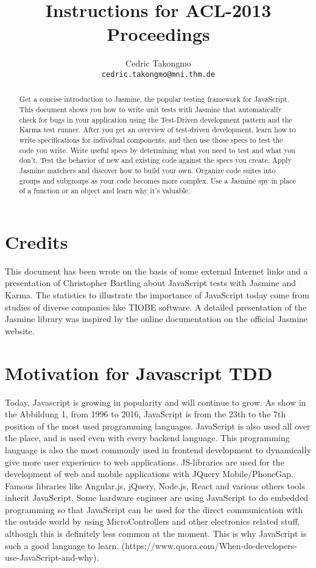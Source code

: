 \documentclass[11pt]{article}
\title{Instructions for ACL-2013 Proceedings}
\author{Cedric Takongmo \\
  {\tt cedric.takongmo@mni.thm.de}}
\date{}
\begin{document}
\maketitle
\begin{abstract}
Get a concise introduction to Jasmine, the popular testing framework for JavaScript. This document shows you how to write unit tests with Jasmine that automatically check for bugs in your application using the Test-Driven development pattern and the Karma test runner. After you get an overview of test-driven development, learn how to write specifications for individual components, and then use those specs to test the code you write. Write useful specs by determining what you need to test and what you don’t. Test the behavior of new and existing code against the specs you create. Apply Jasmine matchers and discover how to build your own. Organize code suites into groups and subgroups as your code becomes more complex. Use a Jasmine spy in place of a function or an object and learn why it’s valuable.
\end{abstract}

\section{Credits}

This document has been wrote on the basis of some external Internet links and a presentation of Christopher Bartling about JavaScript tests with Jasmine and Karma. The statistics to illustrate the importance of JavaScript today come from studies of diverse companies like TIOBE software. A detailed presentation of the Jasmine library was inspired by the online documentation on the official Jasmine website. 

\section{Motivation for Javascript TDD}

Today, Javascript is growing in popularity and will continue to grow. As show in the Abbildung 1, from 1996 to 2016, JavaScript is from the 23th to the 7th position of the most used programming languages. JavaScript is also used all over the place, and is used even with every backend language. This programming language is also the most commonly used in frontend development to dynamically give more user experience to web applications. JS-libraries are used for the development of web and mobile applications with JQuery Mobile/PhoneGap. Famous libraries like Angular.js, jQuery, Node.js, React and various others tools inherit JavaScript. Some hardware engineer are using JavaScript to do embedded programming so that JavaScript can be used for the direct communication with the outside world by using MicroControllers and other electronics related stuff, although this is definitely less common at the moment. This is why JavaScript is such a good language to learn. (https://www.quora.com/When-do-developers-use-JavaScript-and-why).
\end{document}
